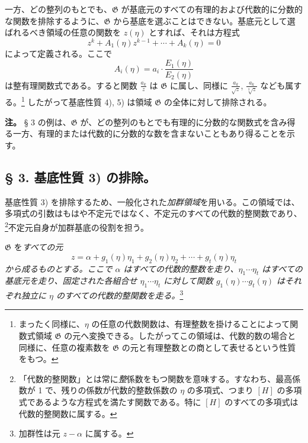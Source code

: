 \documentclass[11pt]{article}
\begin{document}
一方、どの整列のもとでも、$\mathfrak G$ が基底元のすべての有理的および代数的に分数的な関数を排除するように、$\mathfrak G$ から基底を選ぶことはできない。基底元として選ばれるべき領域の任意の関数を $z(\eta)$ とすれば、それは方程式
\[
 z^k+A_1(\eta)z^{k-1}+\cdots+A_k(\eta)=0
\]
によって定義される。ここで
\[
 A_i(\eta)=a_i\cdot\frac{E_1(\eta)}{E_2(\eta)}
\]
は整有理関数式である。すると関数 $\frac{a_k}{z}$ は $\mathfrak G$ に属し、同様に $\frac{a_k}{\sqrt z}$, $\frac{a_k}{\sqrt[3]z}$ なども属する。\footnote{まったく同様に、$\eta$ の任意の代数関数は、有理整数を掛けることによって関数式領域 $\mathfrak G$ の元へ変換できる。したがってこの領域は、代数的数の場合と同様に、任意の複素数を $\mathfrak G$ の元と有理整数との商として表せるという性質をもつ。} したがって基底性質 4), 5) は領域 $\mathfrak G$ の全体に対して排除される。

\textbf{注。} § 3 の例は、$\mathfrak G$ が、どの整列のもとでも有理的に分数的な関数式を含み得る一方、有理的または代数的に分数的な数を含まないこともあり得ることを示す。

\subsection*{§ 3. 基底性質 3) の排除。}

基底性質 3) を排除するため、一般化された\emph{加群領域}を用いる。この領域では、多項式の引数はもはや不定元ではなく、不定元のすべての代数的整関数であり、\footnote{「代数的整関数」とは常に\emph{整}係数をもつ関数を意味する。すなわち、最高係数が 1 で、残りの係数が代数的整数係数の $\eta$ の多項式、つまり $[H]$ の多項式であるような方程式を満たす関数である。特に $[H]$ のすべての多項式は代数的整関数に属する。}不定元自身が加群基底の役割を担う。

$\mathfrak G$ を\emph{すべての元}
\begin{equation}
 z=\alpha+g_1(\eta)\eta_1+g_2(\eta)\eta_2+\cdots+g_t(\eta)\eta_t
\tag{1}
\end{equation}
\emph{から成るものとする。ここで $\alpha$ はすべての代数的整数を走り、$\eta_1\cdots\eta_t$ はすべての基底元を走り、固定された各組合せ $\eta_1\cdots\eta_t$ に対して関数 $g_1(\eta)\cdots g_t(\eta)$ はそれぞれ独立に $\eta$ のすべての代数的整関数を走る。}\footnote{加群性は元 $z-\alpha$ に属する。}
\end{document}
